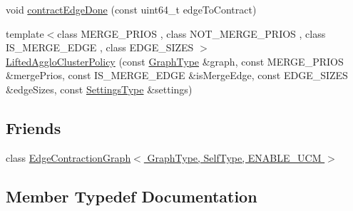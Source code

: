 \begin{DoxyCompactItemize}
\item 
void \hyperlink{classnifty_1_1graph_1_1agglo_1_1LiftedAggloClusterPolicy_ad9d7485c9c849f48ac44e87fd385415d}{contract\+Edge\+Done} (const uint64\+\_\+t edge\+To\+Contract)
\item 
{\footnotesize template$<$class M\+E\+R\+G\+E\+\_\+\+P\+R\+I\+OS , class N\+O\+T\+\_\+\+M\+E\+R\+G\+E\+\_\+\+P\+R\+I\+OS , class I\+S\+\_\+\+M\+E\+R\+G\+E\+\_\+\+E\+D\+GE , class E\+D\+G\+E\+\_\+\+S\+I\+Z\+ES $>$ }\\\hyperlink{classnifty_1_1graph_1_1agglo_1_1LiftedAggloClusterPolicy_a508b7d1816f45e00752e045a1c342e54}{Lifted\+Agglo\+Cluster\+Policy} (const \hyperlink{classnifty_1_1graph_1_1agglo_1_1LiftedAggloClusterPolicy_a727d681b2fa133b8c9b225ab11cd2402}{Graph\+Type} \&graph, const M\+E\+R\+G\+E\+\_\+\+P\+R\+I\+OS \&merge\+Prios, const I\+S\+\_\+\+M\+E\+R\+G\+E\+\_\+\+E\+D\+GE \&is\+Merge\+Edge, const E\+D\+G\+E\+\_\+\+S\+I\+Z\+ES \&edge\+Sizes, const \hyperlink{structnifty_1_1graph_1_1agglo_1_1LiftedAggloClusterPolicy_1_1SettingsType}{Settings\+Type} \&settings)
\end{DoxyCompactItemize}
\subsection*{Friends}
\begin{DoxyCompactItemize}
\item 
class \hyperlink{classnifty_1_1graph_1_1agglo_1_1LiftedAggloClusterPolicy_a6939aa4c6113ba9c44fd5e048687ba92}{Edge\+Contraction\+Graph$<$ Graph\+Type, Self\+Type, E\+N\+A\+B\+L\+E\+\_\+\+U\+C\+M $>$}
\end{DoxyCompactItemize}


\subsection{Member Typedef Documentation}
\mbox{\label{classnifty_1_1graph_1_1agglo_1_1LiftedAggloClusterPolicy_a2fb57e57cf31de0f2d446cfd17d263a7}} 
